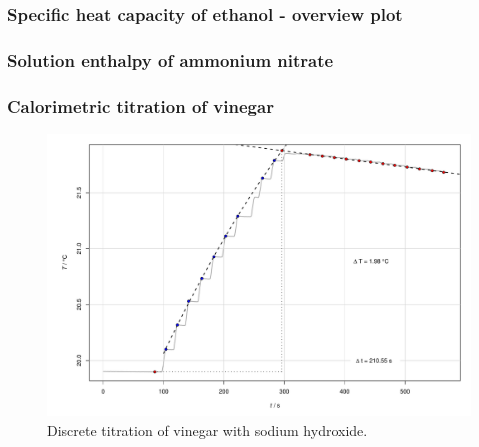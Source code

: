 \subsubsection{Specific heat capacity of ethanol - overview plot}

\newpage


\subsubsection{Solution enthalpy of ammonium nitrate}

 
 \label{append:unc_sol}



\subsubsection{Calorimetric titration of vinegar}

\begin{figure}[H]
    \centering
    \includegraphics[width=.95\textwidth]{figures/plots/vinegar_uncont_highres.pdf}
    \caption{Discrete titration of vinegar with sodium hydroxide.}
    \label{fig:vinegar_uncont_highres}
\end{figure}

